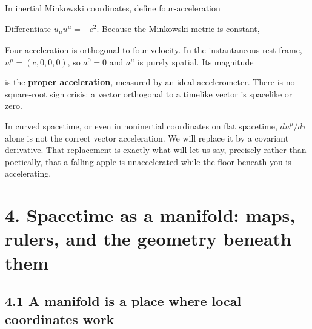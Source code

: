 \documentclass[
  11pt,
  letterpaper,
  oneside,
  openany]{scrbook}
\begin{document}
In inertial Minkowski coordinates, define four-acceleration

\begin{center}
\begingroup
{}
\ifdim\wd\grmathbox>\linewidth
\resizebox{\linewidth}{!}{\usebox{\grmathbox}}
\else\usebox{\grmathbox}\fi
\endgroup
\end{center}

Differentiate \(u_\mu u^\mu=-c^2\). Because the Minkowski metric is
constant,

\begin{center}
\begingroup
{}
\ifdim\wd\grmathbox>\linewidth
\resizebox{\linewidth}{!}{\usebox{\grmathbox}}
\else\usebox{\grmathbox}\fi
\endgroup
\end{center}

Four-acceleration is orthogonal to four-velocity. In the instantaneous
rest frame, \(u^\mu=(c,0,0,0)\), so \(a^0=0\) and \(a^\mu\) is purely
spatial. Its magnitude

\begin{center}
\begingroup
{}
\ifdim\wd\grmathbox>\linewidth
\resizebox{\linewidth}{!}{\usebox{\grmathbox}}
\else\usebox{\grmathbox}\fi
\endgroup
\end{center}

is the \textbf{proper acceleration}, measured by an ideal accelerometer.
There is no square-root sign crisis: a vector orthogonal to a timelike
vector is spacelike or zero.

In curved spacetime, or even in noninertial coordinates on flat
spacetime, \(du^\mu/d\tau\) alone is not the correct vector
acceleration. We will replace it by a covariant derivative. That
replacement is exactly what will let us say, precisely rather than
poetically, that a falling apple is unaccelerated while the floor
beneath you is accelerating.

\hypertarget{chapter-4}{%
\chapter{4. Spacetime as a manifold: maps, rulers, and the geometry
beneath them}\label{chapter-4}}

\hypertarget{a-manifold-is-a-place-where-local-coordinates-work}{%
\section{4.1 A manifold is a place where local coordinates
work}\label{a-manifold-is-a-place-where-local-coordinates-work}}
\end{document}
